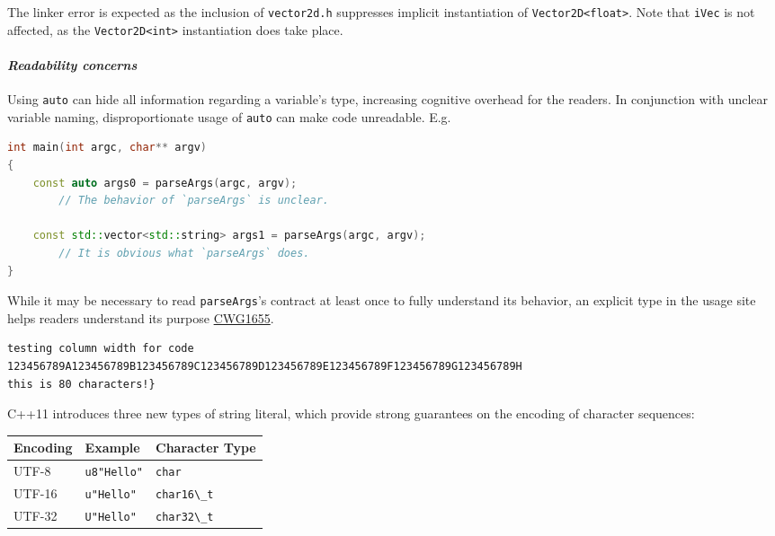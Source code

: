 \documentclass[twoside,10pt,letterpaper,usenames]{newstyle-PearsonGeneric-7-38}
\newcommand{\passthrough}[1]{\lstset{mathescape=false}#1\lstset{mathescape=true}}
\begin{document}
The linker error is expected as the inclusion of
\passthrough{\lstinline!vector2d.h!} suppresses implicit instantiation
of \passthrough{\lstinline!Vector2D<float>!}. Note that
\passthrough{\lstinline!iVec!} is not affected, as the
\passthrough{\lstinline!Vector2D<int>!} instantiation does take place.

\hypertarget{readability-concerns}{%
\paragraph{\texorpdfstring{\emph{Readability
concerns}}{Readability concerns}}\label{readability-concerns}}

Using \passthrough{\lstinline!auto!} can hide all information regarding
a variable's type, increasing cognitive overhead for the readers. In
conjunction with unclear variable naming, disproportionate usage of
\passthrough{\lstinline!auto!} can make code unreadable. E.g.

\begin{lstlisting}[language=C++, caption={ missing caption }, label={ testlabel }, frame=tb]
int main(int argc, char** argv)
{
    const auto args0 = parseArgs(argc, argv);
        // The behavior of `parseArgs` is unclear.

    const std::vector<std::string> args1 = parseArgs(argc, argv);
        // It is obvious what `parseArgs` does.
}
\end{lstlisting}
    

While it may be necessary to read \passthrough{\lstinline!parseArgs!}'s
contract at least once to fully understand its behavior, an explicit
type in the usage site helps readers understand its purpose
\href{http://wg21.link/cwg1655}{CWG1655}.

\begin{lstlisting}
testing column width for code 
123456789A123456789B123456789C123456789D123456789E123456789F123456789G123456789H 
this is 80 characters!}
\end{lstlisting}

C++11 introduces three new types of string literal, which provide strong
guarantees on the encoding of character sequences:

\begin{longtable}[]{@{}lll@{}}
\toprule
Encoding & Example & Character Type\tabularnewline
\midrule
\endhead
UTF-8 & \passthrough{\lstinline!u8"Hello"!} &
\passthrough{\lstinline!char!}\tabularnewline
UTF-16 & \passthrough{\lstinline!u"Hello"!} &
\passthrough{\lstinline!char16\_t!}\tabularnewline
UTF-32 & \passthrough{\lstinline!U"Hello"!} &
\passthrough{\lstinline!char32\_t!}\tabularnewline
\bottomrule
\end{longtable}
\end{document}
